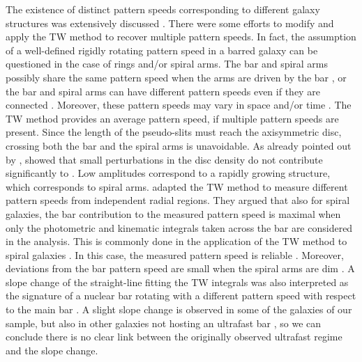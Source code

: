 \documentclass{aa}
\begin{document}
The existence of distinct pattern speeds corresponding to different galaxy structures was extensively discussed \citep{Rautiainen2008,Cuomo2019b}. There were some efforts to modify and apply the TW method to recover multiple pattern speeds. In fact, the assumption of a well-defined rigidly rotating pattern speed in a barred galaxy can be questioned in the case of rings and/or spiral arms. The bar and spiral arms possibly share the same pattern speed when the arms are driven by the bar \citep{Sanders1976}, or the bar and spiral arms can have different pattern speeds even if they are connected \citep{Sellwood1988,Beckman2018,Hilmi2020}. Moreover, these pattern speeds may vary in space and/or time \citep{Toomre1981,Bertin1996}. The TW method provides an average pattern speed, if multiple pattern speeds are present.
Since the length of the pseudo-slits must reach the axisymmetric disc, crossing both the bar and the spiral arms is unavoidable. As already pointed out by \cite{Tremaine1984}, \cite{Debattista2002b} showed that small perturbations in the disc density do not contribute significantly to \omegabar. Low amplitudes correspond to a rapidly growing structure, which corresponds to spiral arms. \cite{Meidt2008} adapted the TW method to measure different pattern speeds from independent radial regions. They argued that also for spiral galaxies, the bar contribution to the measured pattern speed is maximal when only the photometric and kinematic integrals taken across the bar are considered in the analysis. This is commonly done in the application of the TW method to spiral galaxies \citep{Aguerri2015,Cuomo2019b,Guo2019,Garma-Oehmichen2020,Williams2021}. In this case, the measured pattern speed is reliable \citep{Meidt2008}.
Moreover, deviations from the bar pattern speed are small when the spiral arms are dim \citep{Williams2021}. A slope change of the straight-line fitting the TW integrals was also interpreted as the signature of a nuclear bar rotating with a different pattern speed with respect to the main bar \citep{Corsini2003, Maciejewski2006,Meidt2009}. A slight slope change is observed in some of the galaxies of our sample, but also in other galaxies not hosting an ultrafast bar \citep{Aguerri2015, Cuomo2019b}, so we can conclude there is no clear link between the originally observed ultrafast regime and the slope change.
\end{document}
